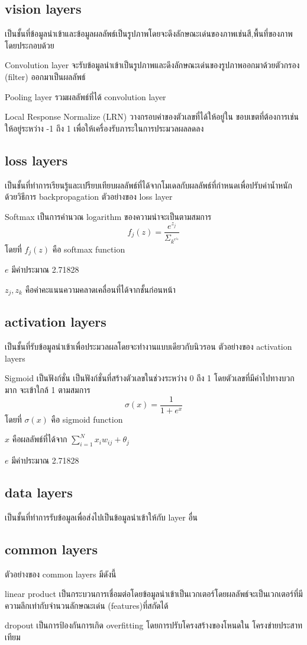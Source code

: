 \subsection {vision layers} เป็นชั้นที่ข้อมูลนำเข้าและข้อมูลผลลัพธ์เป็นรูปภาพโดยจะดึงลักษณะเด่นของภาพเช่นสี,พื้นที่ของภาพโดยประกอบด้วย

Convolution layer จะรับข้อมูลนำเข้าเป็นรูปภาพและดึงลักษณะเด่นของรูปภาพออกมาด้วยตัวกรอง (filter) ออกมาเป็นผลลัพธ์

Pooling layer รวมผลลัพธ์ที่ได้ convolution layer

Local Response Normalize (LRN) วางกรอบค่าของตัวเลขที่ได้ให้อยู่ใน
ขอบเขตที่ต้องการเช่นให้อยู่ระหว่าง -1 ถึง 1 เพื่อให้เครื่องรับภาระในการประมวลผลลดลง
\subsection {loss layers} เป็นชั้นที่ทำการเรียนรู้และเปรียบเทียบผลลัพธ์ที่ได้จากโมเดลกับผลลัพธ์ที่กำหนดเพื่อปรับค่าน้ำหนักด้วยวิธีการ backpropagation ตัวอย่างของ loss layer

Softmax เป็นการคำนวณ logarithm ของความน่าจะเป็นตามสมการ
\[f_j(z)=\frac{e^{z_j}}{\Sigma_{k^{e^{z_k}}}}\]
โดยที่ \(f_j(z)\) คือ softmax function

\(e\) มีค่าประมาณ 2.71828

\(z_j  ,  z_k\) คือค่าคะแนนความคลาดเคลื่อนที่ได้จากชั้นก่อนหน้า

\subsection {activation layers} เป็นชั้นที่รับข้อมูลนำเข้าเพื่อประมวลผลโดยจะทำงานแบบเดียวกับนิวรอน
ตัวอย่างของ activation layers

Sigmoid เป็นฟังก์ชั่น เป็นฟังก์ชั่นที่สร้างตัวเลขในช่วงระหว่าง 0 ถึง 1 โดยตัวเลขที่มีค่าไปทางบวกมาก จะเข้าใกล้ 1 ตามสมการ
\[\sigma(x) = \frac{1}{1+e^x}\]
    โดยที่ \(\sigma(x)\) คือ sigmoid function
    
    \(x\) คือผลลัพธ์ที่ได้จาก \(\sum_{i=1}^N x_i w_{ij} + \theta_j\)

    \(e\) มีค่าประมาณ 2.71828

\subsection{data layers} เป็นชั้นที่ทำการรับข้อมูลเพื่อส่งไปเป็นข้อมูลนำเข้าให้กับ layer อื่น
\subsection {common layers}ตัวอย่างของ common layers มีดังนี้

linear product เป็นกระบวนการเชื่อมต่อโดยข้อมูลนำเข้าเป็นเวกเตอร์โดยผลลัพธ์จะเป็นเวกเตอร์ที่มีความลึกเท่ากับจำนวนลักษณะเด่น (features)ที่สกัดได้

dropout เป็นการป้องกันการเกิด overfitting โดยการปรับโครงสร้างของโหนดใน
โครงข่ายประสาทเทียม


